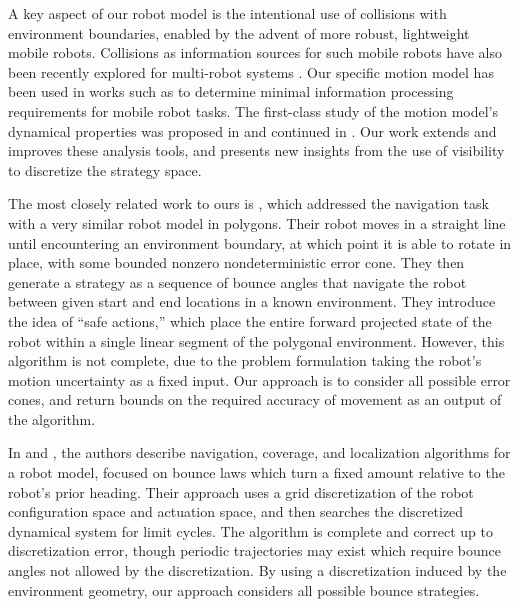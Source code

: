 \documentclass[]{styles/svproc}  %
\begin{document}
A key aspect of our robot model is the intentional use of collisions with
environment boundaries, enabled by the advent of more robust, lightweight mobile
robots. Collisions as information sources for such mobile robots have also been
recently explored for multi-robot systems \cite{mayya2017collisions}. Our
specific motion model has been used in works such as \cite{OkaLav06} to
determine minimal information processing requirements for mobile robot tasks.
The first-class study of the motion model's dynamical properties was proposed in
\cite{bounce} and continued in \cite{NilBecLav17}. Our work extends and improves
these analysis tools, and presents new insights from the use of visibility to
discretize the strategy space.

The most closely related work to ours is \cite{LewOKa13}, which addressed the
navigation task with a very similar robot model in polygons. Their robot moves
in a straight line until encountering an environment boundary, at which point it
is able to rotate in place, with some bounded nonzero nondeterministic error
cone.
They then generate a strategy as a sequence of bounce angles that navigate
the robot between given start and end locations in a known environment. They
introduce the idea of ``safe actions,'' which place the entire forward projected
state of the robot within a single linear segment of the polygonal environment.
However, this algorithm is not complete, due to the problem formulation taking
the robot's motion uncertainty as a fixed input. Our approach is to consider all
possible error cones, and return bounds on the required accuracy of movement as
an output of the algorithm.




In \cite{alam2017minimalist} and \cite{alam2018space}, the authors describe
navigation, coverage, and localization algorithms for a robot model, focused
on bounce laws which turn a fixed amount relative to the robot's prior heading. 
Their approach uses a grid discretization of the robot configuration space and actuation
space, and then searches the discretized dynamical system for limit cycles. The
algorithm is complete and correct up to discretization error, though periodic
trajectories may exist which require bounce angles not allowed by the
discretization. By using a discretization induced by the environment geometry,
our approach considers all possible bounce strategies.
\end{document}
